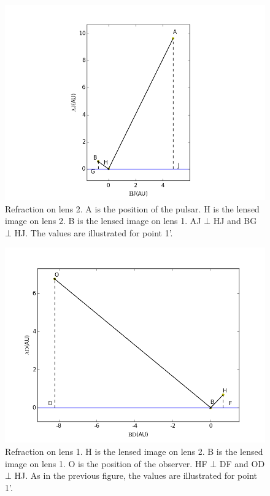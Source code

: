 \documentclass[useAMS,usenatbib]{mn2e}
\begin{document}
\begin{figure}
\centering
\includegraphics[width=1.0\linewidth,scale=1.0]{First_reflection.png}
\caption{Refraction on lens 2. 
A is the position of the pulsar. H is the lensed image on lens 2. B is
the lensed image on lens 1. AJ $\bot$ HJ and BG $\bot$ HJ. The values are illustrated for point 1'.}
\label{first_reflect}
\end{figure}

\begin{figure}
\centering
\includegraphics[width=1.0\linewidth]{Second_reflection.png}
\caption{Refraction on lens 1. 
H is the lensed image on lens 2. B is the lensed image on lens 1. O is the position of the observer. HF $\bot$ DF and OD $\bot$ HJ. As in the previous figure, the values are illustrated for point 1'. }
\label{second_reflect}
\end{figure}
\end{document}
